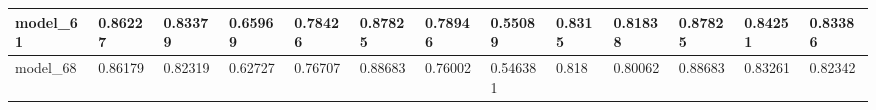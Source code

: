\begin{tabular}{|l|l|l|l|l|l|l|l|l|l|l|l|l|}
model\_61      & 0.86227     & 0.83379        & 0.65969      & 0.78426          & 0.87825              & 0.78946              & 0.55089      & 0.8315            & 0.81838            & 0.87825         & 0.84251     & 0.83386      \\ \hline
model\_68      & 0.86179     & 0.82319        & 0.62727      & 0.76707          & 0.88683              & 0.76002              & 0.546381     & 0.818             & 0.80062            & 0.88683         & 0.83261     & 0.82342      \\ \hline
\end{tabular}